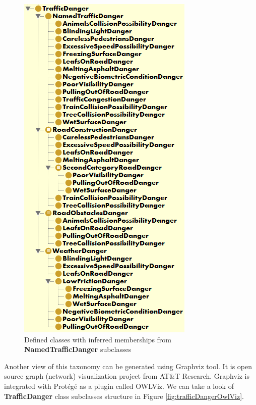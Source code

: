 \medskip

\begin{figure}[htp]
\centering
\includegraphics[scale=0.67]{images/chapter3/InferredClassHierarchy}
\caption{Defined classes with inferred memberships from \textbf{NamedTrafficDanger} subclasses}
\label{fig:inferredClassHierarchy}
\end{figure}

\newpage

\noindent Another view of this taxonomy can be generated using Graphviz tool. It is open source graph (network) visualization project from AT\&T Research. Graphviz is integrated with Protégé as a plugin called OWLViz. We can take a look of \textbf{TrafficDanger} class subclasses structure in Figure \ref{fig:trafficDangerOwlViz}.

\medskip

